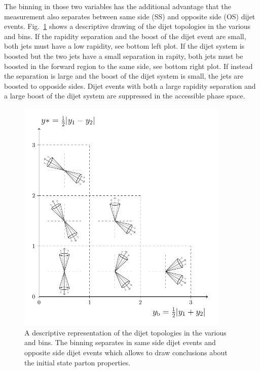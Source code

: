 The binning in those two variables has the additional advantage that the
measurement also separates between same side (SS) and opposite side (OS) dijet
events. Fig.~\ref{fig:ysyb_schema} shows a descriptive drawing of the
dijet topologies in the various \ystar and \yboost bins. If the rapidity
separation and the boost of the dijet event are small, both jets must have a low
rapidity, see bottom left plot. If the dijet system is boosted but the two jets
have a small separation in rapity, both jets must be boosted in the forward region to
the same side, see bottom right plot. If instead the separation is large and the
boost of the dijet system is small, the jets are boosted to opposide
sides. Dijet events with both a large rapidity separation and a large boost of
the dijet system are suppressed in the accessible phase space.

\begin{figure}[htbp]
    \centering
    \includegraphics[width=0.9\textwidth]{figures/measurement/ybys.pdf}
    \caption[Dijet topologies in \ystar and \yboost phasespace]
        {A descriptive representation of the dijet topologies in the various
    \ystar and \yboost bins. The binning separates in same side dijet
    events and opposite side dijet events which allows to draw conclusions about
    the initial state parton properties.}
    \label{fig:ysyb_schema}
\end{figure}

